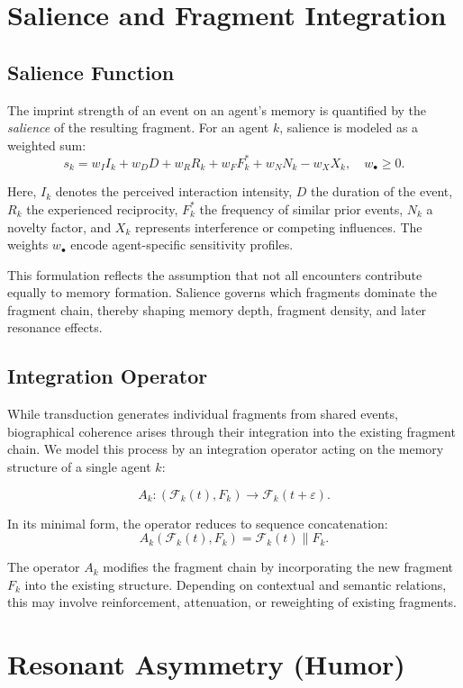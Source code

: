 \documentclass[12pt,a4paper]{article}
\begin{document}
\section{Salience and Fragment Integration}

\subsection{Salience Function}

The imprint strength of an event on an agent’s memory is quantified
by the \emph{salience} of the resulting fragment.
For an agent $k$, salience is modeled as a weighted sum:
\[
s_k
= w_I I_k
+ w_D D
+ w_R R_k
+ w_F F_k^*
+ w_N N_k
- w_X X_k,
\quad w_\bullet \ge 0.
\]

Here, $I_k$ denotes the perceived interaction intensity,
$D$ the duration of the event,
$R_k$ the experienced reciprocity,
$F_k^*$ the frequency of similar prior events,
$N_k$ a novelty factor,
and $X_k$ represents interference or competing influences.
The weights $w_\bullet$ encode agent-specific sensitivity profiles.

This formulation reflects the assumption that not all encounters
contribute equally to memory formation.
Salience governs which fragments dominate the fragment chain,
thereby shaping memory depth, fragment density, and later resonance effects.

\subsection{Integration Operator}

While transduction generates individual fragments from shared events, biographical
coherence arises through their integration into the existing fragment chain.  
We model this process by an integration operator acting on the memory structure of a
single agent $k$:

\[
A_k : (\mathcal{F}_k(t), F_k) \longrightarrow \mathcal{F}_k(t+\varepsilon).
\]

In its minimal form, the operator reduces to sequence concatenation:
\[
A_k(\mathcal{F}_k(t), F_k)
= \mathcal{F}_k(t) \mathbin{\|} F_k.
\]

The operator $A_k$ modifies the fragment chain by incorporating the new fragment
$F_k$ into the existing structure. Depending on contextual and semantic relations,
this may involve reinforcement, attenuation, or reweighting of existing fragments.


\section{Resonant Asymmetry (Humor)}
\label{sec:asymmetry}
\end{document}
